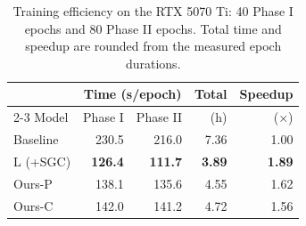 \begin{table}[!t]
\centering
\caption{Training efficiency on the RTX 5070 Ti: 40 Phase I epochs and 80 Phase II epochs. Total time and speedup are rounded from the measured epoch durations.}
\label{tab:training}
\small
\setlength{\tabcolsep}{4pt}
\begin{tabular}{@{}lrrrr@{}}
\toprule
 & \multicolumn{2}{c}{Time (s/epoch)} & Total & Speedup\\
\cmidrule(lr){2-3}
Model & Phase I & Phase II & (h) & ($\times$)\\
\midrule
Baseline & 230.5 & 216.0 & 7.36 & 1.00\\
L (+SGC) & \textbf{126.4} & \textbf{111.7} & \textbf{3.89} & \textbf{1.89}\\
Ours-P & 138.1 & 135.6 & 4.55 & 1.62\\
Ours-C & 142.0 & 141.2 & 4.72 & 1.56\\
\bottomrule
\end{tabular}
\end{table}
